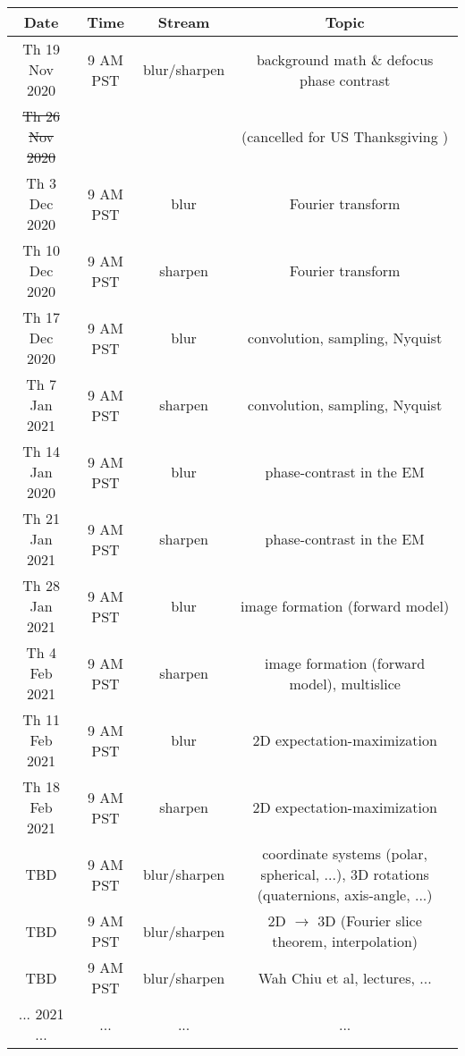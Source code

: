 \documentclass[11pt, oneside]{article}   	%
\begin{document}
\begin{center}
\small
 \begin{tabular}{|| c c c c||} 
 \hline
 Date & Time & Stream & Topic \\ [0.5ex] 
 \hline\hline
Th 19 Nov 2020 & \tiny{9 AM PST} &  blur/sharpen & background math \& defocus phase contrast  \\ 
 \hline
\sout{Th 26 Nov 2020}  &   & & (cancelled for US Thanksgiving )    \\ 
 \hline
Th 3 Dec 2020 & \tiny{9 AM PST} & blur & Fourier transform   \\ 
 \hline
Th 10 Dec 2020 & \tiny{9 AM PST} & sharpen & Fourier transform   \\ 
 \hline
Th 17 Dec 2020 & \tiny{9 AM PST} & blur & convolution, sampling, Nyquist   \\ 
 \hline
Th 7 Jan 2021 & \tiny{9 AM PST} & sharpen & convolution, sampling, Nyquist   \\ 
 \hline
Th 14 Jan 2020 & \tiny{9 AM PST} & blur & phase-contrast in the EM   \\ 
 \hline
Th 21 Jan 2021 & \tiny{9 AM PST} & sharpen & phase-contrast in the EM   \\ 
 \hline
Th 28 Jan 2021 & \tiny{9 AM PST} & blur & image formation (forward model)   \\ 
 \hline
Th 4 Feb 2021 & \tiny{9 AM PST} & sharpen & image formation (forward model), multislice   \\ 
 \hline
Th 11 Feb 2021 & \tiny{9 AM PST} & blur &  2D expectation-maximization \\ 
 \hline
Th 18 Feb 2021 & \tiny{9 AM PST} & sharpen &  2D expectation-maximization   \\ 
 \hline
TBD & \tiny{9 AM PST} & blur/sharpen & \tiny{coordinate systems (polar, spherical, ...), 3D rotations (quaternions, axis-angle, ...)} \\ 
 \hline
TBD & \tiny{9 AM PST} & blur/sharpen & 2D $\rightarrow$  3D (Fourier slice theorem, interpolation) \\ 
 \hline
TBD & \tiny{9 AM PST} & blur/sharpen & Wah Chiu et al, lectures, ...  \\ [1ex] 
 \hline
 ... 2021 ... & ... &  ... & ...  \\ 
 \hline
\end{tabular}
\end{center}
\end{document}
